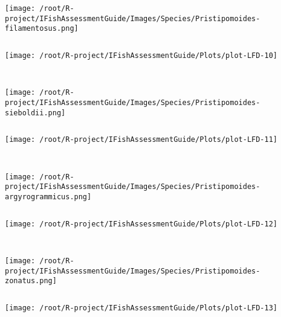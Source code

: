 \documentclass{report}\usepackage[]{graphicx}\usepackage[]{color}
\makeatletter
\def\maxwidth{ %
  \ifdim\Gin@nat@width>\linewidth
    \linewidth
  \else
    \Gin@nat@width
  \fi
}
\newenvironment{kframe}{%
 \def\at@end@of@kframe{}%
 \ifinner\ifhmode%
  \def\at@end@of@kframe{\end{minipage}}%
  \begin{minipage}{\columnwidth}%
 \fi\fi%
 \def\FrameCommand##1{\hskip\@totalleftmargin \hskip-\fboxsep
 \colorbox{shadecolor}{##1}\hskip-\fboxsep
     \hskip-\linewidth \hskip-\@totalleftmargin \hskip\columnwidth}%
 \MakeFramed {\advance\hsize-\width
   \@totalleftmargin\z@ \linewidth\hsize
   \@setminipage}}%
 {\par\unskip\endMakeFramed%
 \at@end@of@kframe}
\newenvironment{knitrout}{}{} %
\makeatother
\begin{document}
\begin{knitrout}
\begin{kframe}
\begin{verbatim}
\end{verbatim}
\end{kframe}
\texttt{[image: /root/R-project/IFishAssessmentGuide/Images/Species/Pristipomoides-filamentosus.png]}
\begin{kframe}\begin{verbatim}
\end{verbatim}
\end{kframe}
\texttt{[image: /root/R-project/IFishAssessmentGuide/Plots/plot-LFD-10]} 
\begin{kframe}\begin{verbatim}
 
\end{verbatim}
\end{kframe}
\texttt{[image: /root/R-project/IFishAssessmentGuide/Images/Species/Pristipomoides-sieboldii.png]}
\begin{kframe}\begin{verbatim}
\end{verbatim}
\end{kframe}
\texttt{[image: /root/R-project/IFishAssessmentGuide/Plots/plot-LFD-11]} 
\begin{kframe}\begin{verbatim}
 
\end{verbatim}
\end{kframe}
\texttt{[image: /root/R-project/IFishAssessmentGuide/Images/Species/Pristipomoides-argyrogrammicus.png]}
\begin{kframe}\begin{verbatim}
\end{verbatim}
\end{kframe}
\texttt{[image: /root/R-project/IFishAssessmentGuide/Plots/plot-LFD-12]} 
\begin{kframe}\begin{verbatim}
 
\end{verbatim}
\end{kframe}
\texttt{[image: /root/R-project/IFishAssessmentGuide/Images/Species/Pristipomoides-zonatus.png]}
\begin{kframe}\begin{verbatim}
\end{verbatim}
\end{kframe}
\texttt{[image: /root/R-project/IFishAssessmentGuide/Plots/plot-LFD-13]} 
\begin{kframe}\begin{verbatim}
 

\end{verbatim}
\end{kframe}
\end{knitrout}
\end{document}
